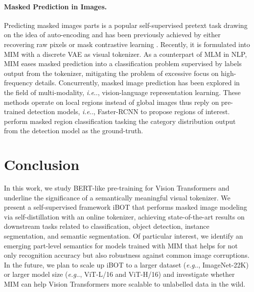 \documentclass{article} %
\makeatletter
\def\ourmethod{{iBOT}\xspace}
\DeclareRobustCommand\onedot{\futurelet\@let@token\@onedot}
\def\@onedot{\ifx\@let@token.\else.\null\fi\xspace}
\def\eg{\emph{e.g}\onedot} \def\Eg{\emph{E.g}\onedot}
\def\ie{\emph{i.e}\onedot} \def\Ie{\emph{I.e}\onedot}
\makeatother
\begin{document}
\paragraph{Masked Prediction in Images.} 
Predicting masked images parts is a popular self-supervised pretext task drawing on the idea of auto-encoding and has been previously achieved by either recovering raw pixels \citep{inpainting,sit,mst} or mask contrastive learning \citep{cpcv2,maskco}. 
Recently, it is formulated into MIM \citep{beit,vimpac} with a discrete VAE \citep{dvae,dalle} as visual tokenizer. As a counterpart of MLM in NLP, MIM eases masked prediction into a classification problem supervised by labels output from the tokenizer, mitigating the problem of excessive focus on high-frequency details.
Concurrently, masked image prediction has been explored in the field of multi-modality, \ie, vision-language representation learning. These methods operate on local regions instead of global images thus reply on pre-trained detection models, \ie, Faster-RCNN \citep{fasterrcnn} to propose regions of interest. \citep{vlbert,vilbert,uniter} perform masked region classification tasking the category distribution output from the detection model as the ground-truth.

\section{Conclusion}
In this work, we study BERT-like pre-training for Vision Transformers and underline the significance of a semantically meaningful visual tokenizer.
We present a self-supervised framework \ourmethod that performs masked image modeling via self-distillation with an online tokenizer, achieving state-of-the-art results on downstream tasks related to classification, object detection, instance segmentation, and semantic segmentation.
Of particular interest, we identify an emerging part-level semantics for models trained with MIM that helps for not only recognition accuracy but also robustness against common image corruptions.
In the future, we plan to scale up \ourmethod to a larger dataset (\eg, ImageNet-22K) or larger model size (\eg, ViT-L/16 and ViT-H/16) and investigate whether MIM can help Vision Transformers more scalable to unlabelled data in the wild.
\end{document}
